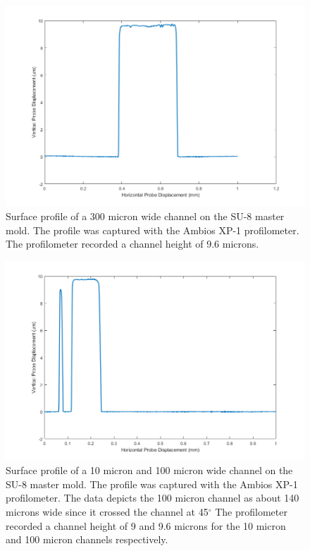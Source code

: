 \begin{figure}[h]
    \centering
    \includegraphics[width=\textwidth]{images/300umWideChannel.png}
    \caption[Surface profile of a 300 micron wide channel on the SU-8 master mold.]{Surface profile of a 300 micron wide channel on the SU-8 master mold. The profile was captured with the Ambios XP-1 profilometer. The profilometer recorded a channel height of 9.6 microns.}
    \label{fig:profilometer_300um_channel}
\end{figure}

\begin{figure}[h]
    \centering
    \includegraphics[width=\textwidth]{images/10umWideAndSidewaysThrough100umWide.png}
    \caption[Surface profile of a 10 micron and 100 micron wide channel on the SU-8 master mold.]{Surface profile of a 10 micron and 100 micron wide channel on the SU-8 master mold. The profile was captured with the Ambios XP-1 profilometer. The data depicts the 100 micron channel as about 140 microns wide since it crossed the channel at 45$^\circ$ The profilometer recorded a channel height of 9 and 9.6 microns for the 10 micron and 100 micron channels respectively.}
    \label{fig:profilometer_10um_channel_100um_sideways}
\end{figure}


